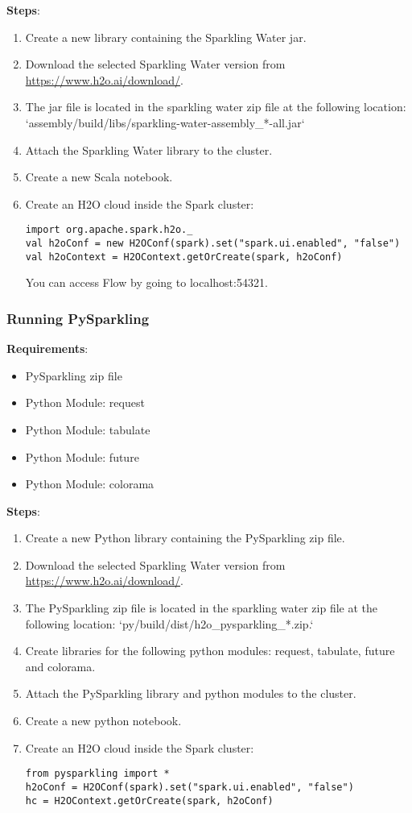 \textbf{Steps}:
\begin{enumerate}
\item Create a new library containing the Sparkling Water jar.
\item Download the selected Sparkling Water version from \url{https://www.h2o.ai/download/}.
\item The jar file is located in the sparkling water zip file at the following location: `assembly/build/libs/sparkling-water-assembly\_*-all.jar`
\item Attach the Sparkling Water library to the cluster.
\item Create a new Scala notebook.
\item Create an H2O cloud inside the Spark cluster:
\begin{lstlisting}[style=Scala]
import org.apache.spark.h2o._
val h2oConf = new H2OConf(spark).set("spark.ui.enabled", "false")
val h2oContext = H2OContext.getOrCreate(spark, h2oConf)
\end{lstlisting}
You can access Flow by going to localhost:54321.
\end{enumerate}

\newpage
\subsubsection{Running PySparkling}

\textbf{Requirements}:
\begin{itemize}
\item PySparkling zip file
\item Python Module: request
\item Python Module: tabulate
\item Python Module: future
\item Python Module: colorama
\end{itemize}

\textbf{Steps}:
\begin{enumerate}
\item Create a new Python library containing the PySparkling zip file.
\item Download the selected Sparkling Water version from \url{https://www.h2o.ai/download/}.
\item The PySparkling zip file is located in the sparkling water zip file at the following location: `py/build/dist/h2o\_pysparkling\_*.zip.`
\item Create libraries for the following python modules: request, tabulate, future and colorama.
\item Attach the PySparkling library and python modules to the cluster.
\item Create a new python notebook.
\item Create an H2O cloud inside the Spark cluster:
\begin{lstlisting}[style=Python]
from pysparkling import *
h2oConf = H2OConf(spark).set("spark.ui.enabled", "false")
hc = H2OContext.getOrCreate(spark, h2oConf)
\end{lstlisting}

\end{enumerate}


